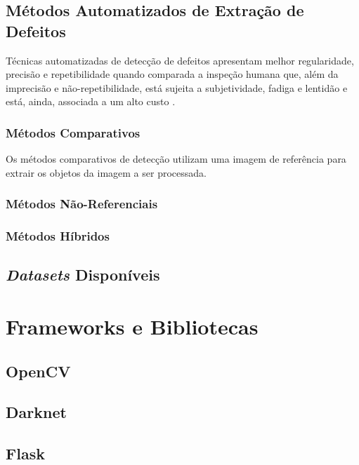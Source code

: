 \begin{figure}[h!]
\begin{subfigure}[H]{0.3\textwidth}
        \label{fig:fund-defeitos6}
    \end{subfigure}
	\label{fig:fund-defeitos}
\end{figure}

\subsection{Métodos Automatizados de Extração de Defeitos} \label{cap:fund-pcb-metodos}

Técnicas automatizadas de detecção de defeitos apresentam melhor regularidade, precisão e repetibilidade quando comparada a inspeção humana que, além da imprecisão e não-repetibilidade, está sujeita a subjetividade, fadiga e lentidão e está, ainda, associada a um alto custo \cite{ref:Leta-Feliciano-Martins}.



\subsubsection{Métodos Comparativos} \label{cap:fund-pcb-metodos-comp}
Os métodos comparativos de detecção utilizam uma imagem de referência para extrair os objetos da imagem a ser processada.

\subsubsection{Métodos Não-Referenciais} \label{cap:fund-pcb-metodos-nref}

\subsubsection{Métodos Híbridos} \label{cap:fund-pcb-metodos-hib}

\subsection{\textit{Datasets} Disponíveis} \label{cap:fund-pcb-datasets}

\section{Frameworks e Bibliotecas} \label{cap:fund-frameworks}
\subsection{OpenCV} \label{cap:fund-frameworks-opencv}
\subsection{Darknet} \label{cap:fund-frameworks-darknet}
\subsection{Flask} \label{cap:fund-frameworks-flask}
